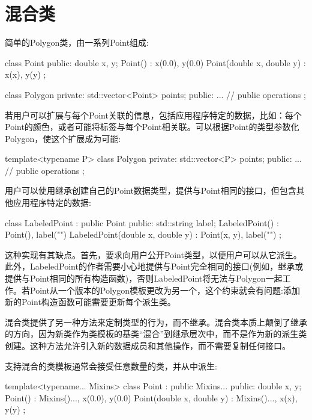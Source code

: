 \section{混合类}

简单的Polygon类，由一系列Point组成:

\begin{cpp}
class Point
{
	public:
	double x, y;
	Point() : x(0.0), y(0.0) { }
	Point(double x, double y) : x(x), y(y) { }
};

class Polygon
{
	private:
	std::vector<Point> points;
	public:
	... // public operations
};
\end{cpp}

若用户可以扩展与每个Point关联的信息，包括应用程序特定的数据，比如：每个Point的颜色，或者可能将标签与每个Point相关联。可以根据Point的类型参数化Polygon，使这个扩展成为可能:

\begin{cpp}
template<typename P>
class Polygon
{
	private:
	std::vector<P> points;
	public:
	... // public operations
};
\end{cpp}

用户可以使用继承创建自己的Point数据类型，提供与Point相同的接口，但包含其他应用程序特定的数据:

\begin{cpp}
class LabeledPoint : public Point
{
	public:
	std::string label;
	LabeledPoint() : Point(), label("") { }
	LabeledPoint(double x, double y) : Point(x, y), label("") { }
};
\end{cpp}

这种实现有其缺点。首先，要求向用户公开Point类型，以便用户可以从它派生。此外，LabeledPoint的作者需要小心地提供与Point完全相同的接口(例如，继承或提供与Point相同的所有构造函数)，否则LabeledPoint将无法与Polygon一起工作。若Point从一个版本的Polygon模板更改为另一个，这个约束就会有问题:添加新的Point构造函数可能需要更新每个派生类。

混合类提供了另一种方法来定制类型的行为，而不继承。混合类本质上颠倒了继承的方向，因为新类作为类模板的基类“混合”到继承层次中，而不是作为新的派生类创建。这种方法允许引入新的数据成员和其他操作，而不需要复制任何接口。

支持混合的类模板通常会接受任意数量的类，并从中派生:

\begin{cpp}
template<typename... Mixins>
class Point : public Mixins...
{
	public:
	double x, y;
	Point() : Mixins()..., x(0.0), y(0.0) { }
	Point(double x, double y) : Mixins()..., x(x), y(y) { }
};
\end{cpp}

